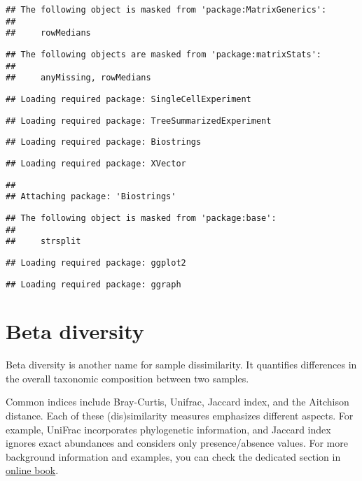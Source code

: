 \documentclass[
  oneside]{book}
\begin{document}
\begin{verbatim}
## The following object is masked from 'package:MatrixGenerics':
## 
##     rowMedians
\end{verbatim}

\begin{verbatim}
## The following objects are masked from 'package:matrixStats':
## 
##     anyMissing, rowMedians
\end{verbatim}

\begin{verbatim}
## Loading required package: SingleCellExperiment
\end{verbatim}

\begin{verbatim}
## Loading required package: TreeSummarizedExperiment
\end{verbatim}

\begin{verbatim}
## Loading required package: Biostrings
\end{verbatim}

\begin{verbatim}
## Loading required package: XVector
\end{verbatim}

\begin{verbatim}
## 
## Attaching package: 'Biostrings'
\end{verbatim}

\begin{verbatim}
## The following object is masked from 'package:base':
## 
##     strsplit
\end{verbatim}

\begin{verbatim}
## Loading required package: ggplot2
\end{verbatim}

\begin{verbatim}
## Loading required package: ggraph
\end{verbatim}

\hypertarget{beta-diversity}{%
\chapter{Beta diversity}\label{beta-diversity}}

Beta diversity is another name for sample dissimilarity. It quantifies
differences in the overall taxonomic composition between two samples.

Common indices include Bray-Curtis, Unifrac, Jaccard index, and the
Aitchison distance. Each of these (dis)similarity measures emphasizes
different aspects. For example, UniFrac incorporates phylogenetic
information, and Jaccard index ignores exact abundances and considers
only presence/absence values. For more background information
and examples, you can check the dedicated section in \href{https://microbiome.github.io/OMA/microbiome-diversity.html\#beta-diversity}{online
book}.
\end{document}
